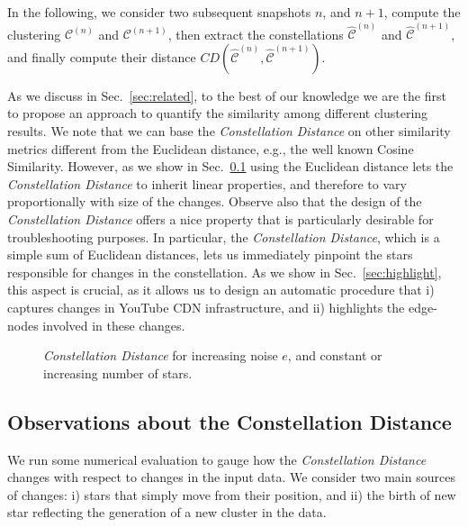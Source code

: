 \documentclass{acm_proc_article-sp}
\newcommand{\distance}{\textit{Constellation Distance}\xspace}
\newcommand{\distintitle}{Constellation Distance\xspace}
\newcommand{\nodes}{{edge-nodes}\xspace}
\begin{document}
In the following, we consider two subsequent snapshots $n$, and $n+1$, compute the clustering $\mathcal{C}^{(n)}$ and $\mathcal{C}^{(n+1)}$, then extract the constellations  $\hat{\mathcal{C}}^{(n)}$ and $\hat{\mathcal{C}}^{(n+1)}$, and finally compute their distance $CD\left(\hat{\mathcal{C}}^{(n)},\hat{\mathcal{C}}^{(n+1)}\right)$.

As we discuss in Sec.~\ref{sec:related}, to the best of our knowledge we are the first to propose an approach to quantify the similarity among different clustering results. We note that we can base the \distance on other similarity metrics different from the Euclidean distance, e.g., the well known Cosine Similarity. 
However, as we show in Sec.~\ref{sec:observation} using the Euclidean distance lets the \distance to inherit linear properties, and therefore to vary proportionally with size of the changes. Observe also that the design of the \distance offers a nice property that is particularly desirable for troubleshooting purposes. In particular, the \distance, which is a simple sum of Euclidean distances, lets us immediately pinpoint the stars responsible for changes in the constellation. As we show in Sec.~\ref{sec:highlight}, this aspect is crucial, as it allows us to design an automatic procedure that i) captures changes in YouTube CDN infrastructure, and ii) highlights the \nodes involved in these changes.







\begin{figure}[t!]
\centering
\hspace*{-0.2cm}
\caption{\distance for increasing noise $e$, and constant or increasing number of stars.}\label{fig:CD}
\end{figure}

\subsection{Observations about the \distintitle}
\label{sec:observation}

We run some numerical evaluation to gauge how the \distance changes with respect to changes in the input data. We consider two main sources of changes: i) stars that simply move from their position, and ii) the birth of new star reflecting the generation of a new cluster in the data.
\end{document}
